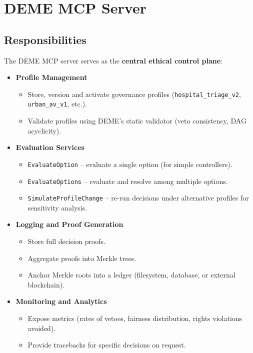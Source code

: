 \documentclass[11pt]{article}
\begin{document}
\section{DEME MCP Server}

\subsection{Responsibilities}

The DEME MCP server serves as the \textbf{central ethical control plane}:

\begin{itemize}
  \item \textbf{Profile Management}
    \begin{itemize}
      \item Store, version and activate governance profiles (\texttt{hospital\_triage\_v2}, \texttt{urban\_av\_v1}, etc.).
      \item Validate profiles using DEME's static validator (veto consistency, DAG acyclicity).
    \end{itemize}

  \item \textbf{Evaluation Services}
    \begin{itemize}
      \item \texttt{EvaluateOption} -- evaluate a single option (for simple controllers).
      \item \texttt{EvaluateOptions} -- evaluate and resolve among multiple options.
      \item \texttt{SimulateProfileChange} -- re-run decisions under alternative profiles for sensitivity analysis.
    \end{itemize}

  \item \textbf{Logging and Proof Generation}
    \begin{itemize}
      \item Store full decision proofs.
      \item Aggregate proofs into Merkle trees.
      \item Anchor Merkle roots into a ledger (filesystem, database, or external blockchain).
    \end{itemize}

  \item \textbf{Monitoring and Analytics}
    \begin{itemize}
      \item Expose metrics (rates of vetoes, fairness distribution, rights violations avoided).
      \item Provide tracebacks for specific decisions on request.
    \end{itemize}
\end{itemize}
\end{document}
